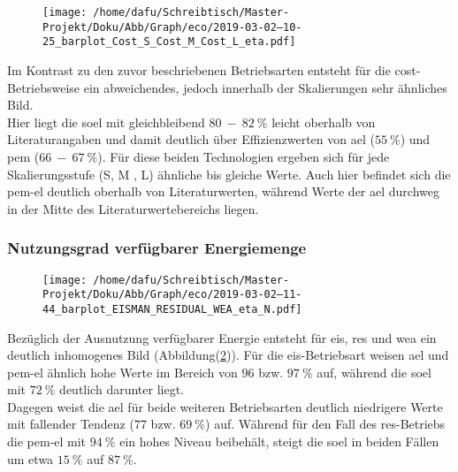 \documentclass[onecolumn,10pt,titlepage]{article}
\begin{document}
\begin{figure}[H]
	
	\centering
	\texttt{[image: /home/dafu/Schreibtisch/Master-Projekt/Doku/Abb/Graph/eco/2019-03-02--10-25\_barplot\_Cost\_S\_Cost\_M\_Cost\_L\_eta.pdf]}
	\caption{ }
	\label{fig:analy_COST_eta} 
\end{figure}
Im Kontrast zu den zuvor beschriebenen Betriebsarten entsteht für die \gls{cost}-Betriebsweise ein abweichendes, jedoch innerhalb der Skalierungen sehr ähnliches Bild.\\
Hier liegt die  \gls{soel} mit gleichbleibend $80~-~82~ \%$ leicht oberhalb von Literaturangaben und damit deutlich über Effizienzwerten von \gls{ael} ($55~\%$) und \gls{pem} ($66~-~67~\%$). Für diese beiden Technologien ergeben sich für jede Skalierungsstufe (S, M , L) ähnliche bis gleiche Werte. Auch hier befindet sich die \gls{pem}-\gls{el} deutlich oberhalb von Literaturwerten, während Werte der \gls{ael} durchweg in der Mitte des Literaturwertebereichs liegen.


\subsubsection{Nutzungsgrad verfügbarer Energiemenge}
\begin{figure}[H]
	\centering
	\texttt{[image: /home/dafu/Schreibtisch/Master-Projekt/Doku/Abb/Graph/eco/2019-03-02--11-44\_barplot\_EISMAN\_RESIDUAL\_WEA\_eta\_N.pdf]}
	\caption{ }
	\label{fig:analy_nC_etaN} 
\end{figure}
Bezüglich der Ausnutzung verfügbarer Energie entsteht für \gls{eis}, \gls{res} und \gls{wea} ein deutlich inhomogenes Bild (Abbildung(\ref{fig:analy_nC_etaN})).
Für die \gls{eis}-Betriebsart weisen \gls{ael} und \gls{pem}-\gls{el} ähnlich hohe Werte im Bereich von $96$ bzw. $97~\%$ auf, während die \gls{soel} mit $72~\%$ deutlich darunter liegt.\\
Dagegen weist die \gls{ael} für beide weiteren Betriebsarten deutlich niedrigere Werte mit fallender Tendenz ($77$ bzw. $69~\%$) auf. Während für den Fall des \gls{res}-Betriebs die \gls{pem}-\gls{el} mit $94~\%$ ein hohes Niveau beibehält, steigt die \gls{soel} in beiden Fällen um etwa $15~\%$ auf $87~\%$. 
  
\end{document}
